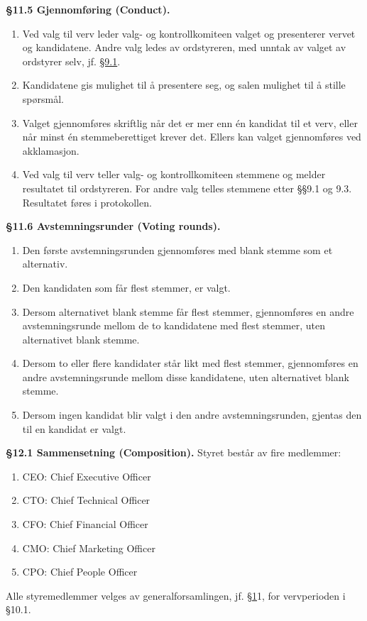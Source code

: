 \documentclass{../../../Common/Latex/Templates/rapport}
\begin{document}
\textbf{\S 11.5 Gjennomføring (Conduct).}\label{bylaw:11.5}
\begin{enumerate}
  \item Ved valg til verv leder valg- og kontrollkomiteen valget og presenterer vervet og kandidatene. Andre valg ledes av ordstyreren, med unntak av valget av ordstyrer selv, jf. \hyperref[bylaw:9.1]{\S 9.1}.
  \item Kandidatene gis mulighet til å presentere seg, og salen mulighet til å stille spørsmål.
  \item Valget gjennomføres skriftlig når det er mer enn én kandidat til et verv, eller når minst én stemmeberettiget krever det. Ellers kan valget gjennomføres ved akklamasjon.
  \item Ved valg til verv teller valg- og kontrollkomiteen stemmene og melder resultatet til ordstyreren. For andre valg telles stemmene etter \S\S9.1 og 9.3. Resultatet føres i protokollen.
\end{enumerate}

\textbf{\S 11.6 Avstemningsrunder (Voting rounds).}\label{bylaw:11.6}
\begin{enumerate}
  \item Den første avstemningsrunden gjennomføres med blank stemme som et alternativ.
  \item Den kandidaten som får flest stemmer, er valgt.
  \item Dersom alternativet blank stemme får flest stemmer, gjennomføres en andre avstemningsrunde mellom de to kandidatene med flest stemmer, uten alternativet blank stemme.
  \item Dersom to eller flere kandidater står likt med flest stemmer, gjennomføres en andre avstemningsrunde mellom disse kandidatene, uten alternativet blank stemme.
  \item Dersom ingen kandidat blir valgt i den andre avstemningsrunden, gjentas den til en kandidat er valgt.
\end{enumerate}

\label{bylaw:12}
\textbf{\S 12.1 Sammensetning (Composition).}\label{bylaw:12.1} Styret består av fire medlemmer:
\begin{enumerate}
  \item CEO: Chief Executive Officer
  \item CTO: Chief Technical Officer
  \item CFO: Chief Financial Officer
  \item CMO: Chief Marketing Officer
  \item CPO: Chief People Officer
\end{enumerate}
Alle styremedlemmer velges av generalforsamlingen, jf. \hyperref[bylaw:1]{\S 1}1, for vervperioden i \S10.1.
\end{document}

